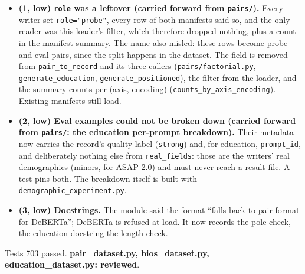 \documentclass{article}
\begin{document}
\begin{itemize}
  \item \textbf{(1, low) \texttt{role} was a leftover (carried forward from \texttt{pairs/}).} Every writer set
        \texttt{role="probe"}, every row of both manifests said so, and the only reader was this loader's filter,
        which therefore dropped nothing, plus a count in the manifest summary. The name also misled: these rows
        become probe and eval pairs, since the split happens in the dataset. The field is removed from
        \texttt{pair\_to\_record} and its three callers (\texttt{pairs/factorial.py},
        \texttt{generate\_education}, \texttt{generate\_positioned}), the filter from the loader, and the summary
        counts per (axis, encoding) (\texttt{counts\_by\_axis\_encoding}). Existing manifests still load.
  \item \textbf{(2, low) Eval examples could not be broken down (carried forward from \texttt{pairs/}: the
        education per-prompt breakdown).} Their metadata now carries the record's quality label
        (\texttt{strong}) and, for education, \texttt{prompt\_id}, and deliberately nothing else from
        \texttt{real\_fields}: those are the writers' real demographics (minors, for ASAP 2.0) and must never reach
        a result file. A test pins both. The breakdown itself is built with \texttt{demographic\_experiment.py}.
  \item \textbf{(3, low) Docstrings.} The module said the format ``falls back to pair-format for DeBERTa'';
        DeBERTa is refused at load. It now records the pole check, the education docstring the length check.
\end{itemize}
Tests 703 passed. \textbf{pair\_dataset.py, bios\_dataset.py, education\_dataset.py: reviewed}.
\end{document}

